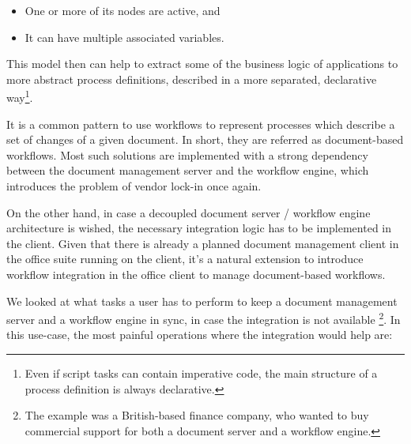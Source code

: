 \begin{itemize}
\item One or more of its nodes are active, and
\item It can have multiple associated variables.
\end{itemize}

This model then can help to extract some of the business logic of applications
to more abstract process definitions, described in a more separated,
declarative way\footnote{Even if script tasks can contain imperative code, the
main structure of a process definition is always declarative.}.

It is a common pattern to use workflows to represent processes which describe a
set of changes of a given document. In short, they are referred as
document-based workflows. Most such solutions are implemented with a strong
dependency between the document management server and the workflow engine,
which introduces the problem of vendor lock-in once again.

On the other hand, in case a decoupled document server / workflow engine
architecture is wished, the necessary integration logic has to be implemented
in the client. Given that there is already a planned document management client
in the office suite running on the client, it's a natural extension to
introduce workflow integration in the office client to manage document-based
workflows.

We looked at what tasks a user has to perform to keep a document management
server and a workflow engine in sync, in case the integration is not available
\footnote{The example was a British-based finance company, who wanted to buy
commercial support for both a document server and a workflow engine.}.  In this
use-case, the most painful operations where the integration would help are:

